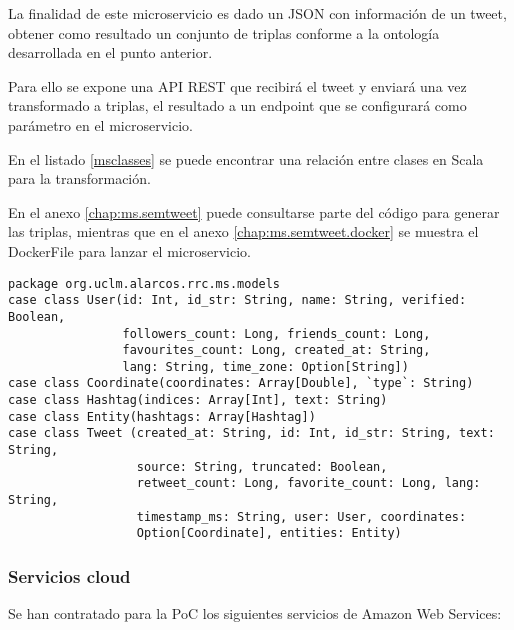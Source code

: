 La finalidad de este microservicio es dado un \acs{JSON} con información de un
tweet, obtener como resultado un conjunto de triplas conforme a la ontología
desarrollada en el punto anterior.

Para ello se expone una \acs{API} \acs{REST} que recibirá el tweet y enviará una
vez transformado a triplas, el resultado a un endpoint que se configurará como
parámetro en el microservicio. 

En el listado \ref{msclasses} se puede encontrar una relación entre clases en
Scala para la transformación. 

En el anexo \ref{chap:ms.semtweet} puede consultarse parte del código para
generar las triplas, mientras que en el anexo \ref{chap:ms.semtweet.docker} se muestra el DockerFile para lanzar el
microservicio. 

\lstset{escapechar=@,language=scala}
\begin{lstlisting}[caption={Entidades de transformación en Scala},captionpos=b, label=msclasses]
package org.uclm.alarcos.rrc.ms.models
case class User(id: Int, id_str: String, name: String, verified: Boolean,
                followers_count: Long, friends_count: Long,
                favourites_count: Long, created_at: String,                
                lang: String, time_zone: Option[String])
case class Coordinate(coordinates: Array[Double], `type`: String)
case class Hashtag(indices: Array[Int], text: String)
case class Entity(hashtags: Array[Hashtag])
case class Tweet (created_at: String, id: Int, id_str: String, text: String,
                  source: String, truncated: Boolean,
                  retweet_count: Long, favorite_count: Long, lang: String,
                  timestamp_ms: String, user: User, coordinates:
                  Option[Coordinate], entities: Entity)
\end{lstlisting}


\subsubsection{Servicios cloud}
\label{res:cloud}
Se han contratado para la \acs{PoC} los siguientes servicios de Amazon Web
Services: 

